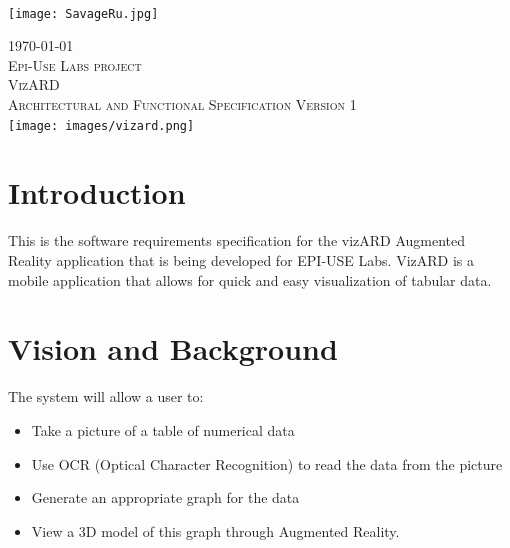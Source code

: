 \documentclass[a4paper,12pt]{article}
\begin{document}
\begin{titlepage}
\begin{minipage}{0.4\textwidth}
\begin{flushright}
\end{flushright}
\end{minipage}\\[0.5cm]


\centering
	\texttt{[image: SavageRu.jpg]}

{\large \today}\\[3cm] %

\centering
	\textsc{\LARGE Epi-Use Labs project}\\[0.5cm]
	\textsc{\Large VizARD}\\[0.5cm]
	\textsc{\Large  Architectural and Functional Specification Version 1}\\[0.5cm]
	\texttt{[image: images/vizard.png]}

 

\vfill %

\end{titlepage}

\newpage

\tableofcontents

\newpage

\section{Introduction}

This is the software requirements specification for the vizARD Augmented Reality application that is being developed for EPI-USE Labs.
\newline
VizARD is a mobile application that allows for quick and easy visualization of tabular data.

\section{Vision and Background}
The system will allow a user to:
\begin{itemize}
\item Take a picture of a table of numerical data
\item Use OCR (Optical Character Recognition) to read the data from the picture
\item Generate an appropriate graph for the data
\item View a 3D model of this graph through Augmented Reality.
\end{itemize} 
\end{document}
